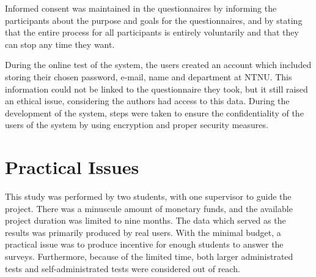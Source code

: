 Informed consent was maintained in the questionnaires by informing the participants about the purpose and goals for the questionnaires, and by stating that the entire process for all participants is entirely voluntarily and that they can stop any time they want.

During the online test of the system, the users created an account which included storing their chosen password, e-mail, name and department at NTNU. This information could not be linked to the questionnaire they took, but it still raised an ethical issue, considering the authors had access to this data. During the development of the system, steps were taken to ensure the confidentiality of the users of the system by using encryption and proper security measures.


\section{Practical Issues}
This study was performed by two students, with one supervisor to guide the project. There was a minuscule amount of monetary funds, and the available project duration was limited to nine months. The data which served as the results was primarily produced by real users. With the minimal budget, a practical issue was to produce incentive for enough students to answer the surveys. Furthermore, because of the limited time, both larger administrated tests and self-administrated tests were considered out of reach.

\cleardoublepage




